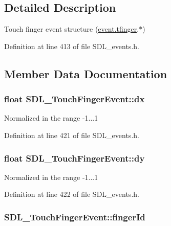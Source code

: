 \subsection{Detailed Description}
Touch finger event structure (\hyperlink{union_s_d_l___event_ab18d7d60794cb056948ffa58541bc3c5}{event.\-tfinger}.$\ast$) 

Definition at line 413 of file S\-D\-L\-\_\-events.\-h.



\subsection{Member Data Documentation}
\hypertarget{struct_s_d_l___touch_finger_event_ac6acac209d6e2bd659fdb6760081393d}{
\subsubsection[{dx}]{\setlength{\rightskip}{0pt plus 5cm}float S\-D\-L\-\_\-\-Touch\-Finger\-Event\-::dx}}\label{struct_s_d_l___touch_finger_event_ac6acac209d6e2bd659fdb6760081393d}
Normalized in the range -\/1...1 

Definition at line 421 of file S\-D\-L\-\_\-events.\-h.

\hypertarget{struct_s_d_l___touch_finger_event_a9c0320c5f18a6b9d10da657e166608c9}{
\subsubsection[{dy}]{\setlength{\rightskip}{0pt plus 5cm}float S\-D\-L\-\_\-\-Touch\-Finger\-Event\-::dy}}\label{struct_s_d_l___touch_finger_event_a9c0320c5f18a6b9d10da657e166608c9}
Normalized in the range -\/1...1 

Definition at line 422 of file S\-D\-L\-\_\-events.\-h.

\hypertarget{struct_s_d_l___touch_finger_event_a8616d46ed19906e3ee90a4d481d3a284}{
\subsubsection[{finger\-Id}]{ S\-D\-L\-\_\-\-Touch\-Finger\-Event\-::finger\-Id}}\label{struct_s_d_l___touch_finger_event_a8616d46ed19906e3ee90a4d481d3a284}


